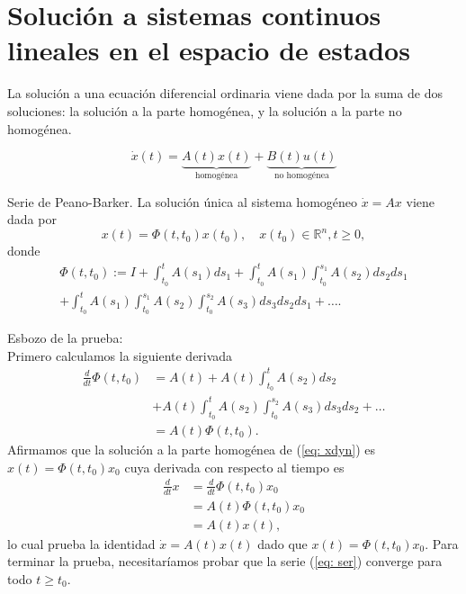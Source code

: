 \section{Solución a sistemas continuos lineales en el espacio de estados}
La solución a una ecuación diferencial ordinaria viene dada por la suma de dos soluciones: la solución a la parte homogénea, y la solución a la parte no homogénea.

\begin{equation}
	\dot x(t) = \underbrace{A(t)x(t)}_{\text{homogénea}} + \underbrace{B(t)u(t)}_{\text{no homogénea}}
	\label{eq: xdyn}
\end{equation}

\begin{theorem}{Serie de Peano-Barker.}
La solución única al sistema homogéneo $\dot x = Ax$ viene dada por
	\begin{equation}
		x(t) = \Phi(t,t_0)x(t_0), \quad x(t_0)\in\mathbb{R}^n, t\geq 0,
	\end{equation}
donde
	\begin{align}
		\Phi(t,t_0) := I + \int_{t_0}^t A(s_1)ds_1 + \int_{t_0}^t A(s_1) \int_{t_0}^{s_1} A(s_2)ds_2ds_1 \nonumber \\ + \int_{t_0}^t A(s_1) \int_{t_0}^{s_1} A(s_2)\int_{t_0}^{s_2} A(s_3) ds_3ds_2ds_1 + \dots . \label{eq: ser}
	\end{align}
\end{theorem}
Esbozo de la prueba: \\
Primero calculamos la siguiente derivada
	\begin{align}
		\frac{d}{dt}\Phi(t,t_0) &= A(t) + A(t)\int_{t_0}^{t}A(s_2)ds_2 \nonumber \\ &+ A(t)\int_{t_0}^t A(s_2) \int_{t_0}^{s_2} A(s_3)ds_3ds_2 + \dots \nonumber \\
		&= A(t) \Phi(t,t_0).
	\end{align}
	Afirmamos que la solución a la parte homogénea de (\ref{eq: xdyn}) es $x(t) = \Phi(t,t_0)x_0$ cuya derivada con respecto al tiempo es
\begin{align}
	\frac{d}{dt} x &= \frac{d}{dt}\Phi(t,t_0)x_0 \nonumber \\
	&= A(t) \Phi(t,t_0) x_0 \nonumber \\
	&= A(t)x(t),
\end{align}
lo cual prueba la identidad $\dot x = A(t)x(t)$ dado que $x(t) = \Phi(t,t_0)x_0$. Para terminar la prueba, necesitaríamos probar que la serie (\ref{eq: ser}) converge para todo $t\geq t_0$.


